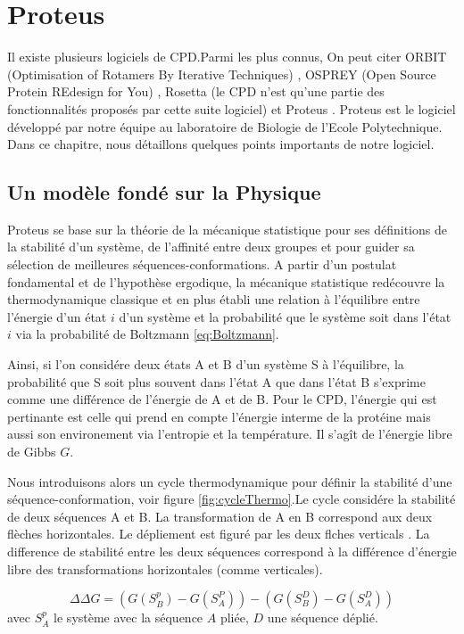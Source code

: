 \chapter{Proteus}
\label{chap:methodes}

Il existe plusieurs logiciels de CPD.Parmi les plus connus, On peut citer ORBIT (Optimisation of Rotamers By Iterative Techniques) \cite{Dahiyat96}, OSPREY (Open Source Protein REdesign for You) \cite{Gainza13}, Rosetta (le CPD n'est qu'une partie des fonctionnalités proposés par cette suite logiciel) \cite{Kuhlman03} et Proteus \cite{Simonson13}. Proteus est le logiciel développé par notre équipe au laboratoire de Biologie de l'Ecole Polytechnique. Dans ce chapitre, nous détaillons quelques points importants de notre logiciel.  

\section{Un modèle fondé sur la Physique}
\label{sec:Phy}
Proteus se base sur la théorie de la mécanique statistique pour ses définitions de la stabilité d'un système, de l'affinité entre deux groupes et pour guider sa sélection de meilleures séquences-conformations. A partir d'un postulat fondamental et de l'hypothèse ergodique, la mécanique statistique \og redécouvre \fg la thermodynamique classique et en plus établi une relation à l'équilibre entre l'énergie d'un état $i$ d'un système et la probabilité que le système soit dans l'état $i$ via la probabilité de Boltzmann \ref{eq:Boltzmann}.

Ainsi, si l'on considére deux états A et B d'un système S à l'équilibre, la probabilité que S soit plus souvent dans l'état A que dans l'état B s'exprime comme une différence de l'énergie de A et de B. Pour le CPD, l'énergie qui est pertinante est celle qui prend en compte l'énergie interme de la protéine mais aussi son environement via l'entropie et la température. Il s'agît de l'énergie libre de Gibbs $G$.

Nous introduisons alors un cycle thermodynamique pour définir la stabilité d'une séquence-conformation, voir figure \ref{fig:cycleThermo}.Le cycle considére la stabilité de deux séquences A et B. La transformation de A en B correspond aux deux flèches horizontales. Le dépliement est figuré par les deux flches verticals . La difference de stabilité entre les deux séquences correspond à la différence d'énergie libre des transformations horizontales (comme verticales).

\begin{equation}
\Delta \Delta G = (G(S^p_B)- G(S^P_A)) - (G(S^D_B)- G(S^D_A))
\end{equation}  
avec $S^p_A$ le système avec la séquence $A$ pliée, $D$ une séquence déplié.

